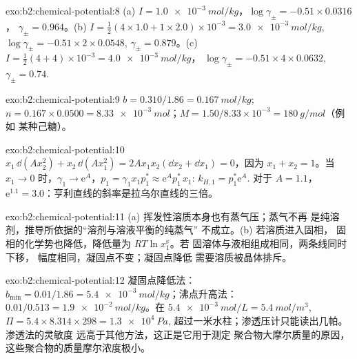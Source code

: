 \begin{solution}{exo:b2:chemical-potential:8}
(a) $I = \qty{1.0e-3}{mol/kg}$，$\log\gamma_\pm = -0.51 \times 0.0316$，
$\gamma_\pm = 0.964$。(b) $I = \frac12(4 \times 1.0 + 1 \times 2.0) \times
10^{-3} = \qty{3.0e-3}{mol/kg}$, $\log\gamma_\pm = -0.51 \times 2 \times 0.0548$,
$\gamma_\pm = 0.879$。(c) $I = \frac12(4 + 4) \times 10^{-3} = \qty{4.0e-3}{mol/kg}$，
$\log\gamma_\pm = -0.51 \times 4 \times 0.0632$, $\gamma_\pm = 0.74$.
\end{solution}

\begin{solution}{exo:b2:chemical-potential:9}
$b = 0.310/1.86 = \qty{0.167}{mol/kg}$; $n = 0.167 \times 0.0500 =
\qty{8.33e-3}{mol}$；$M = 1.50/8.33 \times 10^{-3} = \qty{180}{g/mol}$（例如
某种己糖）。
\end{solution}

\begin{solution}{exo:b2:chemical-potential:10}
$x_1\,\dd(Ax_2^2) + x_2\,\dd(Ax_1^2) = 2Ax_1x_2(\dd x_2 + \dd x_1) = 0$，因为
$x_1 + x_2 = 1$。当 $x_1 \to 0$ 时，$\gamma_1 \to \mathrm e^{A}$，$p_1 =
\gamma_1x_1p_1^* \approx \mathrm e^{A}p_1^*\,x_1$: $k_{H,1} = p_1^*\mathrm e^A$.
对于 $A = 1.1$，$\mathrm e^{1.1} = 3.0$：亨利直线的斜率是拉乌尔直线的三倍。
\end{solution}

\begin{solution}{exo:b2:chemical-potential:11}
(a) 挥发性溶质本身也有蒸气压；蒸气不再
是纯溶剂，推导所依据的“溶剂与溶液平衡的纯蒸气”
不成立。(b) 若溶质进入固相，
固相的化学势也降低，降低量为 $RT\ln x_1^{\text{s}}$。若
固溶体与液相组成相同，两条线同时下移，
幅度相同，凝固点不变；凝固点降低
需要溶质被晶体排斥。
\end{solution}

\begin{solution}{exo:b2:chemical-potential:12}
凝固点降低法：$b_{\min} = 0.01/1.86 = \qty{5.4e-3}{mol/kg}$；沸点升高法：
$0.01/0.513 = \qty{1.9e-2}{mol/kg}$。在 $\qty{5.4e-3}{mol/L} =
\qty{5.4}{mol/m^3}$, $\Pi = 5.4 \times 8.314 \times 298 = \qty{1.3e4}{Pa}$,
超过一米水柱；渗透压计只能读出几帕。渗透法的灵敏度
远高于其他方法，这正是它用于测定
聚合物大摩尔质量的原因，这些聚合物的质量摩尔浓度极小。
\end{solution}

